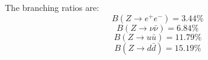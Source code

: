 \documentclass[12pt,a4]{article}
\begin{document}
\begin{enumerate}
\begin{enumerate}
        The branching ratios are:
        \begin{equation*}
          B(Z \to e^+ e^-) = 3.44 \%
        \end{equation*}
        \begin{equation*}
          B(Z \to \nu \bar{\nu}) = 6.84 \%
        \end{equation*}
        \begin{equation*}
          B(Z \to u \bar{u}) = 11.79 \%
        \end{equation*}
        \begin{equation*}
          B(Z \to d \bar{d}) =  15.19\%
        \end{equation*}
    \end{enumerate}
\end{enumerate}
\end{document}
